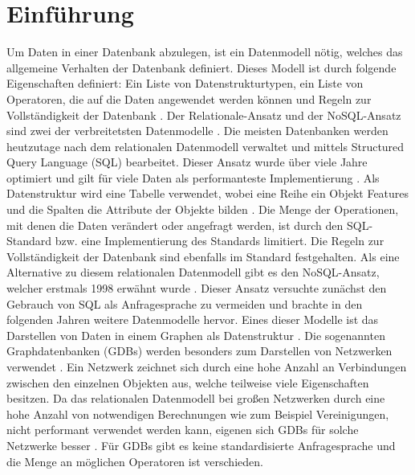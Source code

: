 
\chapter{Einführung} %

\label{Kaptiel1} %


\newcommand{\keyword}[1]{\textit{#1}}
\newcommand{\tabhead}[1]{\textbf{#1}}
\newcommand{\code}[1]{\texttt{#1}}
\newcommand{\file}[1]{\texttt{\bfseries#1}}
\newcommand{\option}[1]{\texttt{\itshape#1}}

Um Daten in einer Datenbank abzulegen, ist ein Datenmodell nötig, welches  das allgemeine Verhalten der Datenbank definiert. Dieses Modell ist durch folgende Eigenschaften definiert: Ein Liste von Datenstrukturtypen, ein Liste von Operatoren, die auf die Daten angewendet werden können und Regeln zur Vollständigkeit der Datenbank \parencite{codd1981data}. Der Relationale-Ansatz und der NoSQL-Ansatz sind zwei der verbreitetsten Datenmodelle \parencite{vicknair2010comparison}. \newline
Die meisten Datenbanken werden heutzutage nach dem relationalen Datenmodell verwaltet und mittels Structured Query Language (SQL) bearbeitet. Dieser Ansatz wurde über viele Jahre optimiert und gilt für viele Daten als performanteste Implementierung \parencite{miller2013graph}. Als Datenstruktur wird eine Tabelle verwendet, wobei eine Reihe ein Objekt Features und die Spalten die Attribute der Objekte bilden \parencite{miller2013graph}. Die Menge der Operationen, mit denen die Daten verändert oder angefragt werden, ist durch den SQL-Standard bzw. eine Implementierung des Standards limitiert. Die Regeln zur Vollständigkeit der Datenbank sind ebenfalls im Standard festgehalten.  \newline 
Als eine Alternative zu diesem relationalen Datenmodell gibt es den NoSQL-Ansatz, welcher erstmals 1998 erwähnt wurde \parencite{strauch2011nosql}. Dieser Ansatz versuchte zunächst den Gebrauch von SQL als Anfragesprache zu vermeiden und brachte in den folgenden Jahren weitere Datenmodelle hervor. Eines dieser Modelle ist das Darstellen von Daten in einem Graphen als Datenstruktur \parencite{miller2013graph}. Die sogenannten Graphdatenbanken (GDBs) werden besonders zum Darstellen von Netzwerken verwendet \parencite{han2011survey}. Ein Netzwerk zeichnet sich durch eine hohe Anzahl an Verbindungen zwischen den einzelnen Objekten aus, welche teilweise viele Eigenschaften besitzen. Da das relationalen Datenmodell bei großen Netzwerken durch eine hohe Anzahl von notwendigen Berechnungen wie zum Beispiel Vereinigungen, nicht performant verwendet werden kann, eigenen sich GDBs für solche Netzwerke besser \parencite{miller2013graph}. Für GDBs gibt es keine standardisierte Anfragesprache und  die Menge an möglichen Operatoren ist verschieden.
